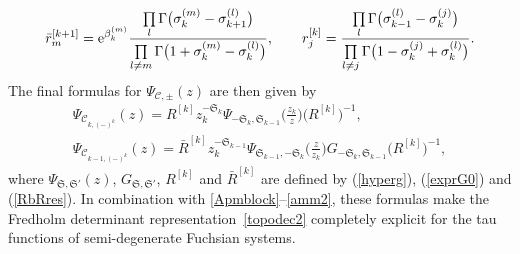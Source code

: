 \documentclass[pdftex]{sigma}
\numberwithin{equation}{section}
\begin{document}
\begin{gather}\label{RbRres}
\bar r^{[k+1]}_m={\rm e}^{\beta_k^{(m)}}\frac{\prod\limits_l \Gamma\big(\sigma^{(m)}_k -\sigma^{(l)}_{k+1} \big)}{ \prod\limits_{l\ne m}\Gamma\big(1+\sigma^{(m)}_k-\sigma^{(l)}_k\big)},\qquad
r^{[k]}_j=\frac {\prod\limits_l \Gamma\big(\sigma^{(l)}_{k-1} - \sigma^{(j)}_k \big)} {\prod\limits_{l \ne j}\Gamma\big(1- \sigma^{(j)}_k +\sigma^{(l)}_k \big)} .
\end{gather}
The final formulas for $\Psi_{\mathcal C,\pm}(z)$ are then given by
\begin{gather*}%
\Psi_{\mathcal {C}_{k,(-)^k}}(z)=R^{[k]} z_k^{-\mathfrak{S}_k}\Psi_{-\mathfrak{S}_k,\mathfrak{S}_{k-1}}\big(\tfrac{z_k}{z} \big) \big(R^{[k]}\big)^{-1},\\
\Psi_{\mathcal {C}_{k-1,(-)^{k}}}(z)= \bar R^{[k]} z_{k}^{-\mathfrak{S}_{k-1}}\Psi_{\mathfrak{S}_{k-1},-\mathfrak{S}_{k}}\big(\tfrac{z}{z_{k}}\big) G_{-\mathfrak{S}_{k},\mathfrak{S}_{k-1}}\big(R^{[k]}\big)^{-1},
\end{gather*}
where $\Psi_{\mathfrak S,\mathfrak S'}(z)$, $G_{\mathfrak S,\mathfrak S'}$, $R^{[k]}$ and $\bar{R}^{[k]}$ are defined by (\ref{hyperg}), (\ref{exprG0}) and (\ref{RbRres}). In combination with \eqref{Apmblock}--\eqref{amm2}, these formulas make the Fredholm determinant representation~\eqref{topodec2} completely explicit for the tau functions of semi-degenerate Fuchsian systems.
\end{document}
